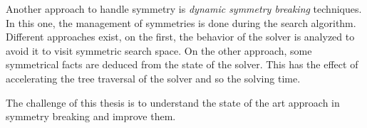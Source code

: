 Another approach to handle symmetry is \emph{dynamic symmetry breaking} techniques. In this one, the management of
symmetries is done during the search algorithm. Different approaches exist, on the first, the behavior of the solver is analyzed to avoid it to visit symmetric search space. On the other approach, some symmetrical facts are deduced from the
state of the solver. This has the effect of accelerating the tree traversal of the solver and so the solving time.



The challenge of this thesis is to understand the state of  the art approach in symmetry breaking and
improve them.

%
%
%
%
%
%





